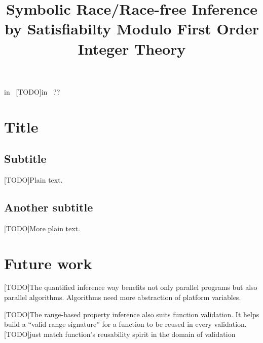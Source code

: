 \documentclass{article}
\begin{document}
\title{Symbolic Race/Race-free Inference by Satisfiabilty Modulo First
Order Integer Theory}
\maketitle



\abstract
[TODO]in~\cite{Java race witness} [TODO]in~\cite{omega} ?? 


\section{Title}

\subsection{Subtitle}
[TODO]Plain text.

\subsection{Another subtitle}
[TODO]More plain text.


\section{Future work}
[TODO]The quantified inference way benefits not only parallel programs but also
parallel algorithms. Algorithms need more abstraction of platform variables.

[TODO]The range-based property inference also suits function validation. It
helps build a ``valid range signature'' for a function to be reused in every
validation. [TODO]just match function's reusability spirit in the
domain of validation
\end{document}
